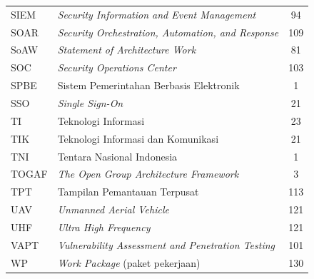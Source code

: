 \begin{longtable}{@{} l >{\raggedright\arraybackslash}p{7.2cm} c @{}}
SIEM & \textit{Security Information and Event Management} & 94 \\
SOAR & \textit{Security Orchestration, Automation, and Response} & 109 \\
SoAW & \textit{Statement of Architecture Work} & 81 \\
SOC & \textit{Security Operations Center} & 103 \\
SPBE & Sistem Pemerintahan Berbasis Elektronik & 1 \\
SSO & \textit{Single Sign-On} & 21 \\
TI & Teknologi Informasi & 23 \\
TIK & Teknologi Informasi dan Komunikasi & 21 \\
TNI & Tentara Nasional Indonesia & 1 \\
TOGAF & \textit{The Open Group Architecture Framework} & 3 \\
TPT & Tampilan Pemantauan Terpusat & 113 \\
UAV & \textit{Unmanned Aerial Vehicle} & 121 \\
UHF & \textit{Ultra High Frequency} & 121 \\
VAPT & \textit{Vulnerability Assessment and Penetration Testing} & 101 \\
WP & \textit{Work Package} (paket pekerjaan) & 130 \\


\end{longtable}